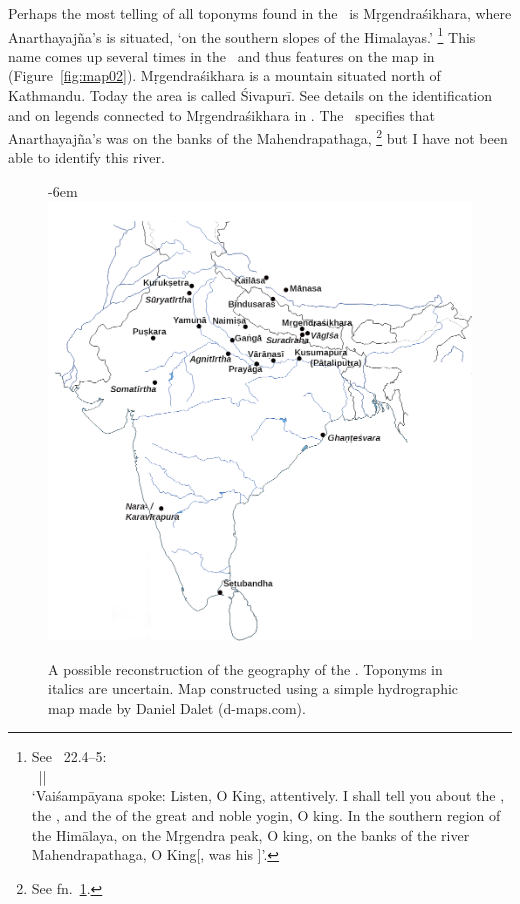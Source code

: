 Perhaps the most telling of all toponyms found
in the \VSS\ is Mṛgendraśikhara,
where Anarthayajña's  is situated,
`on the southern slopes of
					the Himalayas.'%
		\footnote{\label{mrgendrasikhara}See \VSS\ 22.4--5:\\
     		~||\\
			`Vaiśampāyana spoke: Listen, O King, attentively.
		  	I shall tell you about the , 
		  	the , and the  of the
		  	great and noble yogin, O king.
		  	In the southern region of the Himālaya, 
		  	on the Mṛgendra peak, O king,
		  	on the banks of the river Mahendrapathaga, O King[,
		  	was his ]'.}
This name comes up
several times in the \NepMah\ and thus features on
the map in 
(Figure~\ref{fig:map02}). Mṛgendraśikhara is a mountain
situated north of Kathmandu. Today the area is
called Śivapurī. See details on the identification and
on legends connected to Mṛgendraśikhara in
. The \VSS\
specifies that Anarthayajña's  was
on the banks of the Mahendrapathaga,%
		 \footnote{See fn.~\ref{mrgendrasikhara}.}
but I have not been able to identify this river.



\begin{figure}[!]
\leftskip-6em\includegraphics[scale=.4]{images/simplemap.png}
\caption[Geography of the \VSS]{A possible reconstruction of the  geography of the \VSS. Toponyms in italics are uncertain. Map constructed using a simple hydrographic map made by Daniel Dalet (d-maps.com).\label{fig:map01}}
\end{figure}

